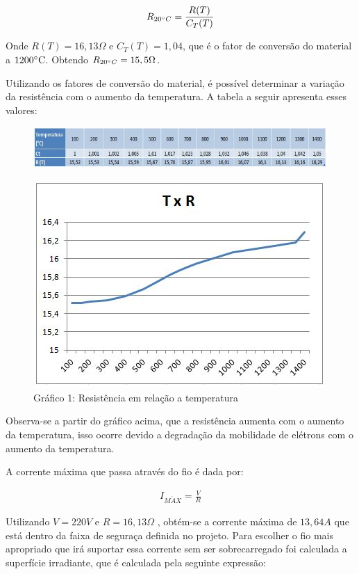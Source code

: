 \begin{gather}
    R_{20 \degree C} = \frac{R(T)}{C_T(T)}
\end{gather}

Onde $R(T)=16,13\Omega$ e $C_{T}(T)=1,04$, que é o fator de conversão do material a $1200\degree \text{C}$. Obtendo $R_{20\degree C}=15,5\Omega$.

Utilizando os fatores de conversão do material, é possível determinar a variação da resistência com o aumento da temperatura. A tabela a seguir apresenta esses valores:
\begin{figure}[!ht]
	\centering
	\label{tabela1}
	\includegraphics[keepaspectratio=true,scale=0.9]{figuras/alimentacao0.JPG}
\end{figure}
\begin{figure}[!h]
	\centering
	\label{grafico1}
	\includegraphics[keepaspectratio=true,scale=0.8]{figuras/alimentacao0_1.JPG}
	\caption{Gráfico 1:  Resistência em relação a temperatura}
\end{figure}

Observa-se a partir do gráfico acima, que a resistência aumenta com o aumento da temperatura, isso ocorre devido a degradação da  mobilidade de elétrons com o aumento da temperatura.

A corrente máxima que passa através do fio é dada por:

\begin{gather}
    I_{M\acute{A}X} = \frac{V}{R}
\end{gather}

Utilizando $V=220V$ e $R=16,13\Omega$ , obtém-se a corrente máxima de $13,64 A$ que está dentro da faixa de seguraça definida no projeto. Para escolher o fio mais apropriado que irá suportar essa corrente sem ser sobrecarregado foi calculada a superfície irradiante, que é calculada pela seguinte expressão:

